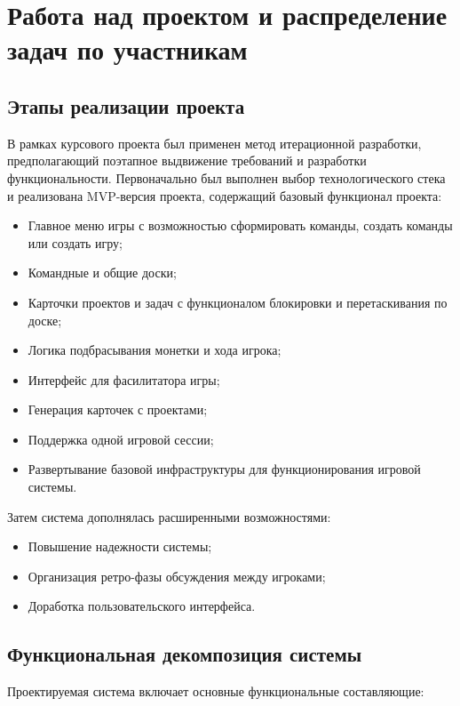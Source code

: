 \section{Работа над проектом и распределение задач по участникам}

\subsection{Этапы реализации проекта}

В рамках курсового проекта был применен метод итерационной разработки, предполагающий поэтапное выдвижение требований и разработки функциональности. Первоначально был выполнен выбор технологического стека и реализована MVP-версия проекта, содержащий базовый функционал проекта:

\begin{itemize}
	\item Главное меню игры с возможностью сформировать команды, создать команды или создать игру;
	\item Командные и общие доски;
	\item Карточки проектов и задач с функционалом блокировки и перетаскивания по доске;
	\item Логика подбрасывания монетки и хода игрока;
	\item Интерфейс для фасилитатора игры;
	\item Генерация карточек с проектами;
	\item Поддержка одной игровой сессии;
	\item Развертывание базовой инфраструктуры для функционирования игровой системы.
\end{itemize}


Затем система дополнялась расширенными возможностями:

\begin{itemize}
	\item Повышение надежности системы;
	\item Организация ретро-фазы обсуждения между игроками;
	\item Доработка пользовательского интерфейса.
\end{itemize}

\subsection{Функциональная декомпозиция системы}

Проектируемая система включает основные функциональные составляющие:


